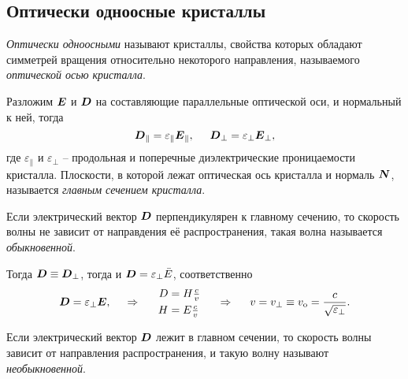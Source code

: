 \subsection{Оптически одноосные кристаллы}

\begin{to_def}
    \textit{Оптически одноосными} называют кристаллы, свойства которых обладают симметрей вращения относительно некоторого направления, называемого \textit{оптической осью кристалла}.
\end{to_def}

Разложим $\mbox{\boldmath $E$}$ и $\mbox{\boldmath $D$}$ на составляющие параллельные оптической оси, и нормальный к ней, тогда
\begin{equation*}
    \mbox{\boldmath $D$}_\parallel = \varepsilon_\parallel \mbox{\boldmath $E$}_\parallel,
    \hspace{5 mm} 
    \mbox{\boldmath $D$}_\bot = \varepsilon_\bot \mbox{\boldmath $E$}_\bot,
\end{equation*}
где $\varepsilon_\parallel$ и $\varepsilon_\bot$ -- продольная и поперечные диэлектрические проницаемости кристалла. Плоскости, в которой лежат оптическая ось кристалла и нормаль $\mbox{\boldmath $N$}$, называется \textit{главным сечением кристалла}. 


\begin{to_def}
    Если электрический вектор $\mbox{\boldmath $D$}$ перпендикулярен к главному сечению, то скорость волны не зависит от направдения её распространения, такая волна называется \textit{обыкновенной}.
\end{to_def}

Тогда $\mbox{\boldmath $D$} \equiv \mbox{\boldmath $D$}_\bot$, тогда и $\mbox{\boldmath $D$} = \varepsilon_\bot \bar{E}$, соответственно 
\begin{equation*}
    \mbox{\boldmath $D$} = \varepsilon_\bot \mbox{\boldmath $E$},
    \hspace{0.5cm} \Rightarrow \hspace{0.5cm}
    \left.\begin{aligned}
        D &= H \textstyle \frac{c}{v} \\
        H &= E \textstyle \frac{c}{v}
    \end{aligned}\right.
    \hspace{5 mm} \Rightarrow \hspace{5 mm} 
    v = v_\bot \equiv v_{\textnormal{o}} = \frac{c}{\sqrt{\varepsilon_\bot}}.
\end{equation*}

\begin{to_def}
    Если электрический вектор $\mbox{\boldmath $D$}$ лежит в главном сечении, то скорость волны зависит от направления распространения, и такую волну называют \textit{необыкновенной}.
\end{to_def}

